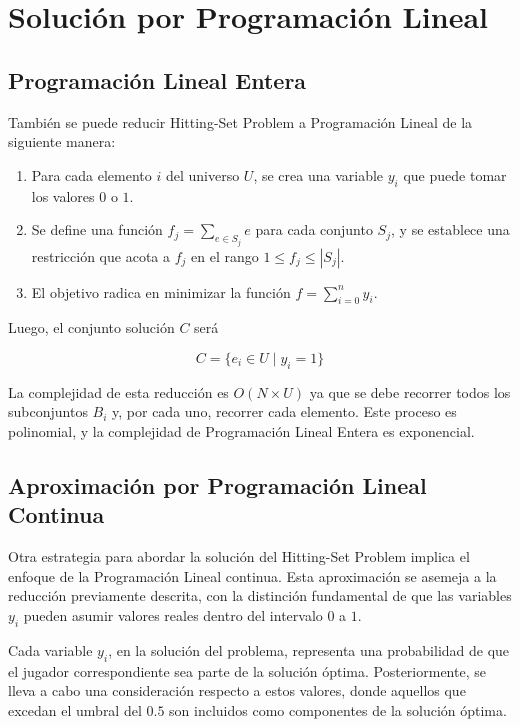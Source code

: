 \section{Solución por Programación Lineal}

\subsection{Programación Lineal Entera}

También se puede reducir Hitting-Set Problem a Programación Lineal de la siguiente manera:

\begin{enumerate}

    \item Para cada elemento $i$ del universo $U$, se crea una variable $y_{i}$ que puede tomar los valores $0$ o $1$.
    
    \item Se define una función \(f_{j} = \sum_{e \in S_j} e\) para cada conjunto \(S_{j}\), y se establece una restricción que acota a \(f_{j}\) en el rango \(1 \leq f_{j} \leq |S_{j}|\).


    \item  El objetivo radica en minimizar la función $f=\sum_{i=0}^{n}y_{i}$.

\end{enumerate}

Luego, el conjunto solución $C$ será

\[
    C = \{e_i \in U \mid y_{i} = 1\}
\]

La complejidad de esta reducción es $O(N \times U)$ ya que se debe recorrer todos los subconjuntos $B_i$ y, por cada uno, recorrer cada elemento. Este proceso es polinomial, y la complejidad de Programación Lineal Entera es exponencial.

\subsection{Aproximación por Programación Lineal Continua}

Otra estrategia para abordar la solución del Hitting-Set Problem implica el enfoque de la Programación Lineal continua. Esta aproximación se asemeja a la reducción previamente descrita, con la distinción fundamental de que las variables 
$y_i$ pueden asumir valores reales dentro del intervalo $0$ a $1$.

Cada variable $y_i$, en la solución del problema, representa una probabilidad de que el jugador correspondiente sea parte de la solución óptima. Posteriormente, se lleva a cabo una consideración respecto a estos valores, donde aquellos que excedan el umbral del $0.5$ son incluidos como componentes de la solución óptima.

